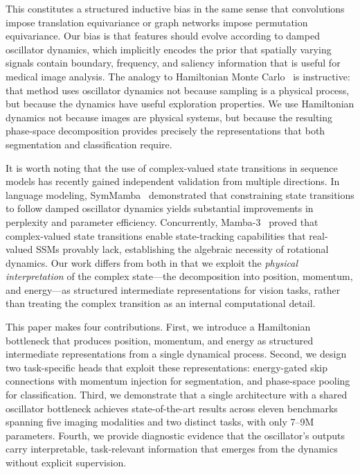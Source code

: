 \documentclass[11pt]{article}
\begin{document}
This constitutes a structured inductive bias in the same sense that convolutions impose translation equivariance or graph networks impose permutation equivariance. Our bias is that features should evolve according to damped oscillator dynamics, which implicitly encodes the prior that spatially varying signals contain boundary, frequency, and saliency information that is useful for medical image analysis. The analogy to Hamiltonian Monte Carlo~\cite{neal2011hmc} is instructive: that method uses oscillator dynamics not because sampling is a physical process, but because the dynamics have useful exploration properties. We use Hamiltonian dynamics not because images are physical systems, but because the resulting phase-space decomposition provides precisely the representations that both segmentation and classification require.

It is worth noting that the use of complex-valued state transitions in sequence models has recently gained independent validation from multiple directions. In language modeling, SymMamba~\cite{symmamba2025} demonstrated that constraining state transitions to follow damped oscillator dynamics yields substantial improvements in perplexity and parameter efficiency. Concurrently, Mamba-3~\cite{mamba3} proved that complex-valued state transitions enable state-tracking capabilities that real-valued SSMs provably lack, establishing the algebraic necessity of rotational dynamics. Our work differs from both in that we exploit the \emph{physical interpretation} of the complex state---the decomposition into position, momentum, and energy---as structured intermediate representations for vision tasks, rather than treating the complex transition as an internal computational detail.

This paper makes four contributions. First, we introduce a Hamiltonian bottleneck that produces position, momentum, and energy as structured intermediate representations from a single dynamical process. Second, we design two task-specific heads that exploit these representations: energy-gated skip connections with momentum injection for segmentation, and phase-space pooling for classification. Third, we demonstrate that a single architecture with a shared oscillator bottleneck achieves state-of-the-art results across eleven benchmarks spanning five imaging modalities and two distinct tasks, with only 7--9M parameters. Fourth, we provide diagnostic evidence that the oscillator's outputs carry interpretable, task-relevant information that emerges from the dynamics without explicit supervision.
\end{document}
